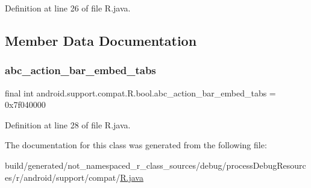 Definition at line 26 of file R.\+java.


\begin{DoxyCode}{0}

\end{DoxyCode}


\subsection{Member Data Documentation}
\mbox{\label{classandroid_1_1support_1_1compat_1_1_r_1_1bool_a2b1c86504041f2552ac19b7856b668f0}} 
\subsubsection{\texorpdfstring{abc\_action\_bar\_embed\_tabs}{abc\_action\_bar\_embed\_tabs}}
{\footnotesize\ttfamily final int android.\+support.\+compat.\+R.\+bool.\+abc\+\_\+action\+\_\+bar\+\_\+embed\+\_\+tabs = 0x7f040000\hspace{0.3cm}{\ttfamily [static]}}



Definition at line 28 of file R.\+java.



The documentation for this class was generated from the following file\+:\begin{DoxyCompactItemize}
\item 
build/generated/not\+\_\+namespaced\+\_\+r\+\_\+class\+\_\+sources/debug/process\+Debug\+Resources/r/android/support/compat/\mbox{\hyperlink{android_2support_2compat_2_r_8java}{R.\+java}}\end{DoxyCompactItemize}
